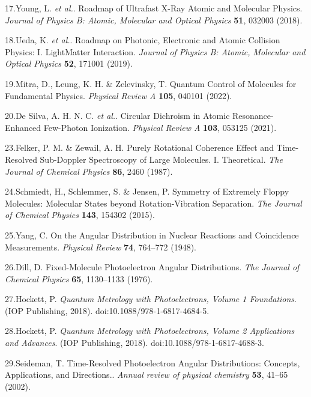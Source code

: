 \documentclass[10pt]{article}
\begin{document}
\label{csl:17}17.Young, L. \textit{et al.}. {Roadmap of Ultrafast X-Ray Atomic and Molecular Physics}. \textit{Journal of Physics B: Atomic, Molecular and Optical Physics} \textbf{51}, 032003 (2018).

\label{csl:18}18.Ueda, K. \textit{et al.}. {Roadmap on Photonic, Electronic and Atomic Collision Physics: {{I}}. {{Light}}\textendash Matter Interaction}. \textit{Journal of Physics B: Atomic, Molecular and Optical Physics} \textbf{52}, 171001 (2019).

\label{csl:19}19.Mitra, D., Leung, K. H. \& Zelevinsky, T. {Quantum Control of Molecules for Fundamental Physics}. \textit{Physical Review A} \textbf{105}, 040101 (2022).

\label{csl:20}20.De Silva, A. H. N. C. \textit{et al.}. {Circular Dichroism in Atomic Resonance-Enhanced Few-Photon Ionization}. \textit{Physical Review A} \textbf{103}, 053125 (2021).

\label{csl:23}23.Felker, P. M. \& Zewail, A. H. {Purely Rotational Coherence Effect and Time-Resolved Sub-{{Doppler}} Spectroscopy of Large Molecules. {{I}}. {{Theoretical}}}. \textit{The Journal of Chemical Physics} \textbf{86}, 2460 (1987).

\label{csl:24}24.Schmiedt, H., Schlemmer, S. \& Jensen, P. {Symmetry of Extremely Floppy Molecules: {{Molecular}} States beyond Rotation-Vibration Separation}. \textit{The Journal of Chemical Physics} \textbf{143}, 154302 (2015).

\label{csl:25}25.Yang, C. {On the {{Angular Distribution}} in {{Nuclear Reactions}} and {{Coincidence Measurements}}}. \textit{Physical Review} \textbf{74}, 764–772 (1948).

\label{csl:26}26.Dill, D. {Fixed-Molecule Photoelectron Angular Distributions}. \textit{The Journal of Chemical Physics} \textbf{65}, 1130–1133 (1976).

\label{csl:27}27.Hockett, P. \textit{{Quantum {{Metrology}} with {{Photoelectrons}}, {{Volume}} 1 {{Foundations}}}}. ({IOP Publishing}, 2018). doi:10.1088/978-1-6817-4684-5.

\label{csl:28}28.Hockett, P. \textit{{Quantum {{Metrology}} with {{Photoelectrons}}, {{Volume}} 2 {{Applications}} and Advances}}. ({IOP Publishing}, 2018). doi:10.1088/978-1-6817-4688-3.

\label{csl:29}29.Seideman, T. {Time-Resolved Photoelectron Angular Distributions: Concepts, Applications, and Directions.}. \textit{Annual review of physical chemistry} \textbf{53}, 41–65 (2002).
\end{document}
